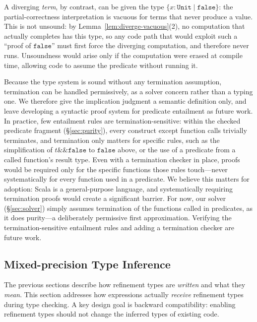 \documentclass[acmsmall]{acmart}
\begin{document}
\noindent A diverging \emph{term}, by contrast, can be given the type $\{x : \texttt{Unit} \mid \texttt{false}\}$: the partial-correctness interpretation is vacuous for terms that never produce a value. This is not unsound: by Lemma~\ref{lem:diverge-vacuous}(2), no computation that actually completes has this type, so any code path that would exploit such a ``proof of $\texttt{false}$'' must first force the diverging computation, and therefore never runs. Unsoundness would arise only if the computation were erased at compile time, allowing code to assume the predicate without running it.

Because the type system is sound without any termination assumption, termination can be handled permissively, as a solver concern rather than a typing one. We therefore give the implication judgment a semantic definition only, and leave developing a syntactic proof system for predicate entailment as future work. In practice, few entailment rules are termination-sensitive: within the checked predicate fragment (\S\ref{sec:purity}), every construct except function calls trivially terminates, and termination only matters for specific rules, such as the simplification of $t \mathbin{\texttt{\&\&}} \texttt{false}$ to $\texttt{false}$ above, or the use of a predicate from a called function's result type. Even with a termination checker in place, proofs would be required only for the specific functions those rules touch---never systematically for every function used in a predicate. We believe this matters for adoption: Scala is a general-purpose language, and systematically requiring termination proofs would create a significant barrier. For now, our solver (\S\ref{sec:solver}) simply assumes termination of the functions called in predicates, as it does purity---a deliberately permissive first approximation. Verifying the termination-sensitive entailment rules and adding a termination checker are future work.

\subsection{Mixed-precision Type Inference}\label{sec:inference}

The previous sections describe how refinement types are \emph{written} and what they \emph{mean}. This section addresses how expressions actually \emph{receive} refinement types during type checking. A key design goal is backward compatibility: enabling refinement types should not change the inferred types of existing code.
\end{document}
